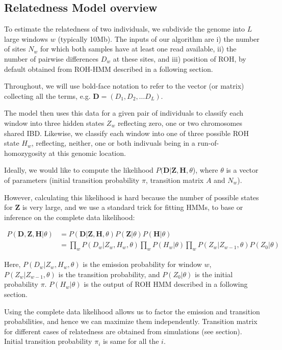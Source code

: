 \documentclass[12pt, letterpaper]{article}
\newcommand{\BZ}{\mathbf{Z}}
\newcommand{\BD}{\mathbf{D}}
\newcommand{\BH}{\mathbf{H}}
\begin{document}
\subsection{Relatedness Model overview} 
To estimate the relatedness of two individuals, we subdivide the genome into $L$ large windows $w$ (typically 10Mb). The inputs of our algorithm are i) the number of sites $N_w$ for which both samples have at least one read available, ii) the number of pairwise differences $D_w$ at these sites, and iii) position of ROH, by default obtained from ROH-HMM described in a following section. 

Throughout, we will use bold-face notation to refer to the vector (or matrix) collecting  all the terms, e.g. $\BD = (D_1, D_2, \dots D_L)$. 

The model then uses this data for a given pair of individuals to classify each window into three hidden states $Z_w$ reflecting zero, one or two chromosomes shared IBD. Likewise, we classify each window into one of three possible ROH state $H_w$, reflecting, neither, one or both indivuals being in a run-of-homozygosity at this genomic location.

Ideally, we would like to compute the likelihood $P(\BD | \BZ, \BH, \theta$), where  $\theta$ is a vector of parameters (initial transition probability $\pi$, transition matrix $A$ and $N_w$). 

However, calculating this likelihood is hard because the number of possible states for $\mathbf{Z}$ is very large, and we use a standard trick for fitting HMMs, to base or inference on the complete data likelihood:


\begin{align}
P(\mathbf{D},\BZ, \BH|\theta) &= P(\mathbf{D}|\mathbf{Z},\BH, \theta) P(\BZ |\theta)P(\BH |\theta) \nonumber\\
&= \prod_w P(D_w|Z_w,H_w, \theta) \prod_w P(H_w |\theta) \prod_w P(Z_w |Z_{w-1},\theta) P(Z_0|\theta)
\end{align}


Here, $P(D_w|Z_w,  H_w, \theta)$ is the emission probability for window $w$,  $P(Z_w|Z_{w-1},\theta)$ is the transition probability, and $P(Z_0| \theta)$ is the initial probability $\pi$. $P(H_w |\theta)$ is the output of ROH HMM described in a following section.

Using the complete data likelihood allows us to factor the emission and transition probabilities, and hence we can maximize them independently.
Transition matrix for different cases of relatedness are obtained from simulations (see section). Initial transition probability $\pi_i$ is same for all the $i$.
\end{document}

